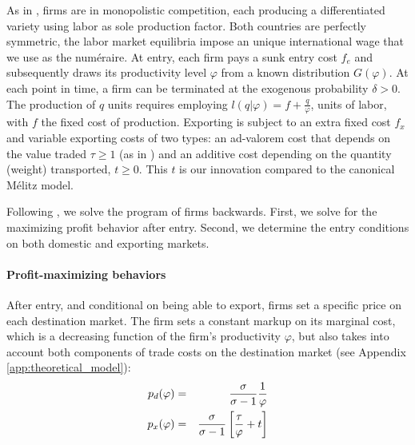 \documentclass[a4paper,11pt]{article}
\begin{document}
As in \cite{melitz}, firms are in monopolistic competition, each producing a differentiated variety using labor as sole production factor. Both countries are perfectly symmetric, the labor market equilibria impose an unique international wage that we use as the num\'{e}raire. At entry, each firm pays a sunk entry cost $f_e$ and subsequently draws its productivity level $\varphi$ from a known distribution $G(\varphi)$.  At each point in time, a firm can be terminated
at the exogenous probability $\delta>0$.
The production of $q$ units requires employing $l(q|\varphi) = f+\frac{q}{\varphi}$, units of labor, with $f$ the fixed cost of production. Exporting is subject to an extra fixed cost $f_x$ and variable exporting costs of two types: an ad-valorem cost that depends on the value traded $\tau\geq 1$ (as in \citealp{melitz}) and an additive cost depending on the quantity (weight) transported, $t\geq 0$. This $t$ is our innovation compared to the canonical Mélitz model.

Following \cite{melitz}, we solve the program of firms backwards. First, we solve for the maximizing profit behavior after entry. Second, we determine the entry conditions on both domestic and exporting markets.\medskip
\paragraph{Profit-maximizing behaviors} After entry, and conditional on being able to export, firms set a specific price on each destination market. The firm sets a constant markup on its marginal cost, which is a decreasing function of the firm's productivity $\varphi$, but also takes into account both components of trade costs on the destination market (see  Appendix \ref{app:theoretical_model}):
\begin{eqnarray}
p_d(\varphi) &=& \frac{\sigma}{\sigma-1}\frac{1}{\varphi} \notag \\
p_x(\varphi) &=& \frac{\sigma}{\sigma-1}\left[\frac{\tau}{\varphi} +t \right] \label{eq:px}
\end{eqnarray}
\end{document}
